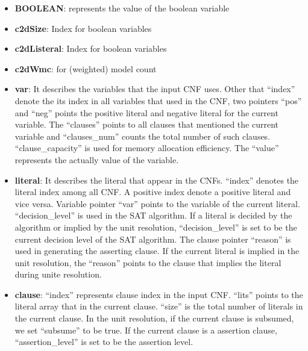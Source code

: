 \documentclass[11pt]{llncs}
\begin{document}
\begin{itemize}
  \item \textbf{BOOLEAN}: represents the value of the boolean variable

  \item \textbf{c2dSize}: Index for boolean variables

  \item \textbf{c2dListeral}: Index for boolean variables

  \item \textbf{c2dWmc}: for (weighted) model count

  \item \textbf{var}: It describes the variables that the input CNF uses.
  Other that ``index'' denote the its index in all variables that used in the CNF, two pointers ``pos'' and ``neg'' points the positive literal and negative literal for the current variable.
  The ``clauses'' points to all clauses that mentioned the current variable and ``clauses\_num'' counts the total number of such clauses.
  ``clause\_capacity'' is used for memory allocation efficiency.
  The ``value'' represents the actually value of the variable.

  \item \textbf{literal}: It describes the literal that appear in the CNFs.
  ``index'' denotes the literal index among all CNF.
  A positive index denote a positive literal and vice versa.
  Variable pointer ``var'' points to the variable of the current literal.
  ``decision\_level'' is used in the SAT algorithm.
  If a literal is decided by the algorithm or implied by the unit resolution, ``decision\_level'' is set to be the current decision level of the SAT algorithm.
  The clause pointer ``reason'' is used in generating the asserting clause.
  If the current literal is implied in the unit resolution, the ``reason'' points to the clause that implies the literal during unite resolution.

  \item \textbf{clause}: ``index'' represents clause index in the input CNF.
  ``lits'' points to the literal array that in the current clause.
  ``size'' is the total number of literals in the current clause.
  In the unit resolution, if the current clause is subsumed, we set ``subsume'' to be true.
  If the current clause is a assertion clause, ``assertion\_level'' is set to be the assertion level.


\end{itemize}
\end{document}
